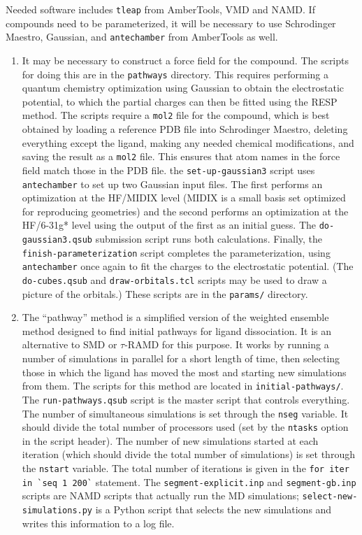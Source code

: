 \documentclass{article}      %
\begin{document}
Needed software includes \verb+tleap+ from AmberTools, VMD and NAMD.  If compounds need to be parameterized, it will be necessary to use Schrodinger Maestro, Gaussian, and \verb+antechamber+ from AmberTools as well.

\begin{enumerate}

\item It may be necessary to construct a force field for the compound.  The scripts for doing this are in the \verb+pathways+ directory.  This requires performing a quantum chemistry optimization using Gaussian to obtain the electrostatic potential, to which the partial charges can then be fitted using the RESP method.  The scripts require a \verb+mol2+ file for the compound, which is best obtained by loading a reference PDB file into Schrodinger Maestro, deleting everything except the ligand, making any needed chemical modifications, and saving the result as a \verb+mol2+ file.  This ensures that atom names in the force field match those in the PDB file.  the \verb+set-up-gaussian3+ script uses \verb+antechamber+ to set up two Gaussian input files.  The first performs an optimization at the HF/MIDIX level (MIDIX is a small basis set optimized for reproducing geometries) and the second performs an optimization at the HF/6-31g* level using the output of the first as an initial guess.  The \verb+do-gaussian3.qsub+ submission script runs both calculations.  Finally, the \verb+finish-parameterization+ script completes the parameterization, using \verb+antechamber+ once again to fit the charges to the electrostatic potential.  (The \verb+do-cubes.qsub+ and \verb+draw-orbitals.tcl+ scripts may be used to draw a picture of the orbitals.) These scripts are in the \verb+params/+ directory.

\item The ``pathway'' method is a simplified version of the weighted ensemble method designed to find initial pathways for ligand dissociation.  It is an alternative to SMD or $\tau$-RAMD for this purpose.  It works by running a number of simulations in parallel for a short length of time, then selecting those in which the ligand has moved the most and starting new simulations from them.  The scripts for this method are located in \verb+initial-pathways/+. The \verb+run-pathways.qsub+ script is the master script that controls everything.   The number of simultaneous simulations is set through the \verb+nseg+ variable.  It should divide the total number of processors used (set by the \verb+ntasks+ option in the script header).  The number of new simulations started at each iteration (which should divide the total number of simulations) is set through the \verb+nstart+ variable.  The total number of iterations is given in the \verb+for iter in `seq 1 200`+ statement.   The \verb+segment-explicit.inp+ and \verb+segment-gb.inp+ scripts are NAMD scripts that actually run the MD simulations; \verb+select-new-simulations.py+ is a Python script that selects the new simulations and writes this information to a log file.  



\end{enumerate}
\end{document}
